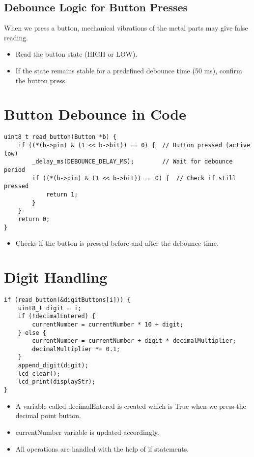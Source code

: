 \documentclass[12pt]{article}
\begin{document}
\subsection{Debounce Logic for Button Presses}

When we press a button, mechanical vibrations of the metal parts may give false reading.
\begin{itemize}
    \item Read the button state (HIGH or LOW).
    \item If the state remains stable for a predefined debounce time (50 ms), confirm the button press.
\end{itemize}
\section{ Button Debounce in Code}
\begin{lstlisting}[caption={Deboune Logic}, label={lst:multiplexing}]
uint8_t read_button(Button *b) {
    if ((*(b->pin) & (1 << b->bit)) == 0) {  // Button pressed (active low)
        _delay_ms(DEBOUNCE_DELAY_MS);        // Wait for debounce period
        if ((*(b->pin) & (1 << b->bit)) == 0) {  // Check if still pressed
            return 1;
        }
    }
    return 0;
}
\end{lstlisting}
\begin{itemize}
    \item Checks if the button is pressed before and after the debounce time.
\end{itemize}
\section{Digit Handling}
\begin{lstlisting}[caption={Digit Handling Logic}, label={lst:multiplexing}]
if (read_button(&digitButtons[i])) {
    uint8_t digit = i;
    if (!decimalEntered) {
        currentNumber = currentNumber * 10 + digit;
    } else {
        currentNumber = currentNumber + digit * decimalMultiplier;
        decimalMultiplier *= 0.1;
    }
    append_digit(digit);
    lcd_clear();
    lcd_print(displayStr);
}
\end{lstlisting}
\begin{itemize}
    \item A variable called decimalEntered is created which is True when we press the decimal point button.
    \item currentNumber variable is updated accordingly.
    \item All operations are handled with the help of if statements.
\end{itemize}
\end{document}
